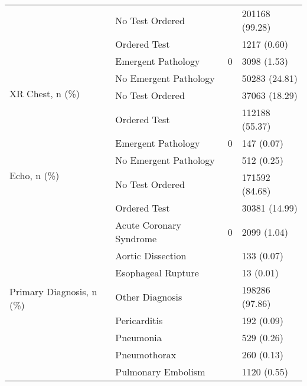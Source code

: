 \begin{tabular}{llll}
 & No Test Ordered &  & 201168 (99.28) \\
 & Ordered Test &  & 1217 (0.60) \\
\cline{1-4}
\multirow[t]{4}{*}{XR Chest, n (\%)} & Emergent Pathology & 0 & 3098 (1.53) \\
 & No Emergent Pathology &  & 50283 (24.81) \\
 & No Test Ordered &  & 37063 (18.29) \\
 & Ordered Test &  & 112188 (55.37) \\
\cline{1-4}
\multirow[t]{4}{*}{Echo, n (\%)} & Emergent Pathology & 0 & 147 (0.07) \\
 & No Emergent Pathology &  & 512 (0.25) \\
 & No Test Ordered &  & 171592 (84.68) \\
 & Ordered Test &  & 30381 (14.99) \\
\cline{1-4}
\multirow[t]{8}{*}{Primary Diagnosis, n (\%)} & Acute Coronary Syndrome & 0 & 2099 (1.04) \\
 & Aortic Dissection &  & 133 (0.07) \\
 & Esophageal Rupture &  & 13 (0.01) \\
 & Other Diagnosis &  & 198286 (97.86) \\
 & Pericarditis &  & 192 (0.09) \\
 & Pneumonia &  & 529 (0.26) \\
 & Pneumothorax &  & 260 (0.13) \\
 & Pulmonary Embolism &  & 1120 (0.55) \\
\cline{1-4}
\bottomrule
\end{tabular}
